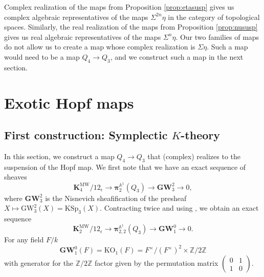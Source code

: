 \documentclass[11pt,leqno]{article}
\newcommand{\Z}{{\mathbb Z}}
\newcommand{\aone}{{\mathbb A}^1}
\renewcommand{\1}{{\rm 1\hspace*{-0.4ex}%
\rule{0.1ex}{1.52ex}\hspace*{0.2ex}}}
\newcommand{\MW}{\mathrm{MW}}
\newcommand{\bpi}{\bm{\pi}}
\newcommand{\piaone}{{\bpi}^{\aone}}
\newcommand{\KMW}[1]{{{\mathbf K}_{#1}^{\MW}}}
\newcommand{\<}[1]{{\langle}#1 {\rangle}}
\theoremstyle{plain}
\theoremstyle{definition}
\theoremstyle{remark}
\numberwithin{equation}{section}
\begin{document}
Complex realization of the maps from Proposition \ref{prop:etasusp} gives us complex algebraic representatives of the maps $\Sigma^{2n}\eta$ in the category of topological spaces. Similarly, the real realization of the maps from Proposition \ref{prop:nususp} gives us real algebraic representatives of the maps $\Sigma^n\eta$. Our two families of maps do not allow us to create a map whose complex realization is $\Sigma \eta$. Such a map would need to be a map $Q_4 \to Q_3$, and we construct such a map in the next section. 

\section{Exotic Hopf maps}

\subsection{First construction: Symplectic $K$-theory}\label{sec:symplecticHopfmap}
In this section, we construct a map $Q_4 \to Q_3$ that (complex) realizes to the suspension of the Hopf map.  We first note that we have an exact sequence of sheaves \cite[Theorem 3]{Asok12a} 
\begin{equation}\label{eqn:pi2a2minus0}
\KMW4/12_\epsilon\to \piaone_{2}(Q_3)\to \mathbf{GW}_3^2\to 0,
\end{equation}
where $\mathbf{GW}_3^2$ is the Nisnevich sheafification of the presheaf $X\mapsto \mathrm{GW}_3^2(X)=\mathrm{KSp}_3(X)$. Contracting twice and using \cite[Proposition 2.9]{Asok12b}, \cite[Proposition 4.4]{Asok12a} we obtain an exact sequence
\[
\KMW2/12_\epsilon\to \piaone_{2,2}(Q_3)\to \mathbf{GW}_1^0\to 0.
\]
For any field $F/k$
\[
\mathbf{GW}_1^0(F)=\mathrm{KO}_1(F)=F^\times/(F^{\times})^2\times \Z/2\Z
\]
with generator for the $\Z/2\Z$ factor given by the permutation matrix $\begin{pmatrix}0 & 1 \\ 1 & 0\end{pmatrix}$. 
\end{document}
